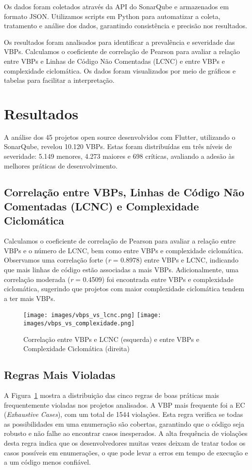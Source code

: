 \documentclass[12pt]{article}
\begin{document}
Os dados foram coletados através da API do SonarQube e armazenados em formato JSON. Utilizamos scripts em Python para automatizar a coleta, tratamento e análise dos dados, garantindo consistência e precisão nos resultados. 

Os resultados foram analisados para identificar a prevalência e severidade das VBPs. Calculamos o coeficiente de correlação de Pearson para avaliar a relação entre VBPs e Linhas de Código Não Comentadas (LCNC) e entre VBPs e complexidade ciclomática. Os dados foram visualizados por meio de gráficos e tabelas para facilitar a interpretação.

\section{Resultados}

A análise dos 45 projetos open source desenvolvidos com Flutter, utilizando o SonarQube, revelou 10.120 VBPs. Estas foram distribuídas em três níveis de severidade: 5.149 menores, 4.273 maiores e 698 críticas, avaliando a adesão às melhores práticas de desenvolvimento.

\subsection{Correlação entre VBPs, Linhas de Código Não Comentadas (LCNC) e Complexidade Ciclomática}
Calculamos o coeficiente de correlação de Pearson para avaliar a relação entre VBPs e o número de LCNC, bem como entre VBPs e complexidade ciclomática. Observamos uma correlação forte (\textit{r} = 0.8978) entre VBPs e LCNC, indicando que mais linhas de código estão associadas a mais VBPs. Adicionalmente, uma correlação moderada (\textit{r} = 0.4509) foi encontrada entre VBPs e complexidade ciclomática, sugerindo que projetos com maior complexidade ciclomática tendem a ter mais VBPs.

\begin{figure}[H]
\centering
\texttt{[image: images/vbps\_vs\_lcnc.png]}
\texttt{[image: images/vbps\_vs\_complexidade.png]}
\caption{Correlação entre VBPs e LCNC (esquerda) e entre VBPs e Complexidade Ciclomática (direita)}
\label{fig
}
\end{figure}

\subsection{Regras Mais Violadas}
A Figura~\ref{fig
} mostra a distribuição das cinco regras de boas práticas mais frequentemente violadas nos projetos analisados. A VBP mais frequente foi a EC (\textit{Exhaustive Cases}), com um total de 1544 violações. Esta regra verifica se todas as possibilidades em uma enumeração são cobertas, garantindo que o código seja robusto e não falhe ao encontrar casos inesperados. A alta frequência de violações desta regra indica que os desenvolvedores muitas vezes deixam de tratar todos os casos possíveis em enumerações, o que pode levar a erros em tempo de execução e a um código menos confiável.
\end{document}
